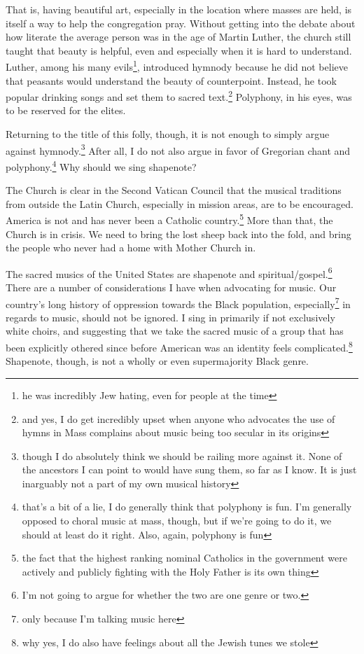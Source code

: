 \documentclass[12pt]{article}
\renewcommand{\,}{\textsuperscript{,}}
\begin{document}
That is, having beautiful art, especially in the location where masses are held, is itself a way to help the congregation pray.  
Without getting into the debate about how literate the average person was in the age of Martin Luther, the church still taught that beauty is helpful, even and especially when it is hard to understand.  
Luther, among his many evils\footnote{he was incredibly Jew hating, even for people at the time}, introduced hymnody because he did not believe that peasants would understand the beauty of counterpoint.  
Instead, he took popular drinking songs and set them to sacred text.\footnote{and yes, I do get incredibly upset when anyone who advocates the use of hymns in Mass complains about music being too secular in its origins}  
Polyphony, in his eyes, was to be reserved for the elites.

Returning to the title of this folly, though, it is not enough to simply argue against hymnody.\footnote{though I do absolutely think we should be railing more against it. None of the ancestors I can point to would have sung them, so far as I know. It is just inarguably not a part of my own musical history}  
After all, I do not also argue in favor of Gregorian chant and polyphony.\footnote{that's a bit of a lie, I do generally think that polyphony is fun. I'm generally opposed to choral music at mass, though, but if we're going to do it, we should at least do it right. Also, again, polyphony is fun}  
Why should we sing shapenote?

The Church is clear in the Second Vatican Council that the musical traditions from outside the Latin Church, especially in mission areas, are to be encouraged.  
America is not and has never been a Catholic country.\footnote{the fact that the highest ranking nominal Catholics in the government were actively and publicly fighting with the Holy Father is its own thing}  
More than that, the Church is in crisis.  
We need to bring the lost sheep back into the fold, and bring the people who never had a home with Mother Church in.

The sacred musics of the United States are shapenote and spiritual/gospel.\footnote{I'm not going to argue for whether the two are one genre or two.}  
There are a number of considerations I have when advocating for music.  
Our country's long history of oppression towards the Black population, especially\footnote{only because I'm talking music here} in regards to music, should not be ignored.  
I sing in primarily if not exclusively white choirs, and suggesting that we take the sacred music of a group that has been explicitly othered since before American was an identity feels complicated.\footnote{why yes, I do also have feelings about all the Jewish tunes we stole}  
Shapenote, though, is not a wholly or even supermajority Black genre.
\end{document}
